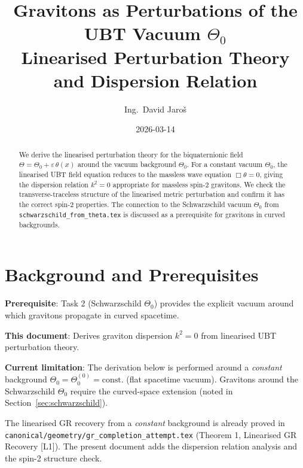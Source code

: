 \documentclass[11pt,a4paper]{article}
\title{\textbf{Gravitons as Perturbations of the UBT Vacuum $\Theta_0$}\\
\large Linearised Perturbation Theory and Dispersion Relation}
\author{Ing.\ David Jaroš}
\date{2026-03-14}
\theoremstyle{definition}
\theoremstyle{remark}
\begin{document}
\maketitle

\begin{abstract}
We derive the linearised perturbation theory for the biquaternionic field
$\Theta = \Theta_0 + \varepsilon\,\theta(x)$ around the vacuum background
$\Theta_0$.  For a constant vacuum $\Theta_0$, the linearised UBT field
equation reduces to the massless wave equation $\Box\theta = 0$, giving
the dispersion relation $k^2 = 0$ appropriate for massless spin-2 gravitons.
We check the transverse-traceless structure of the linearised metric
perturbation and confirm it has the correct spin-2 properties.  The
connection to the Schwarzschild vacuum $\Theta_0$ from
\texttt{schwarzschild\_from\_theta.tex} is discussed as a prerequisite for
gravitons in curved backgrounds.
\end{abstract}

\tableofcontents

\section{Background and Prerequisites}
\label{sec:background}

\begin{tcolorbox}[colback=blue!5!white,colframe=blue!75!black,title=Status]
\textbf{Prerequisite}: Task 2 (Schwarzschild $\Theta_0$) provides the explicit
vacuum around which gravitons propagate in curved spacetime.

\medskip
\textbf{This document}: Derives graviton dispersion $k^2 = 0$ from linearised
UBT perturbation theory.

\medskip
\textbf{Current limitation}: The derivation below is performed around a
\emph{constant} background $\Theta_0 = \Theta_0^{(0)} = \mathrm{const.}$ (flat
spacetime vacuum).  Gravitons around the Schwarzschild $\Theta_0$ require
the curved-space extension (noted in Section~\ref{sec:schwarzschild}).
\end{tcolorbox}

The linearised GR recovery from a \emph{constant} background is already proved
in \texttt{canonical/geometry/gr\_completion\_attempt.tex} (Theorem 1,
Linearised GR Recovery [L1]).  The present document adds the dispersion
relation analysis and the spin-2 structure check.
\end{document}
